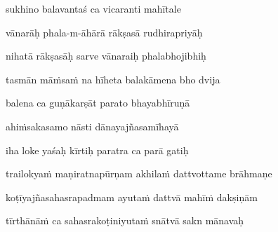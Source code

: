 sukhino balavantaś ca vicaranti mahītale \veg\dontdisplaylinenum

vānarāḥ phala-m-āhārā rākṣasā rudhirapriyāḥ\thinspace{\dandab} \dontdisplaylinenum
{}

nihatā rākṣasāḥ sarve vānaraiḥ phalabhojibhiḥ \veg\dontdisplaylinenum
{}

tasmān māṁsaṁ na hīheta balakāmena bho dvija\thinspace{\dandab} \dontdisplaylinenum
{}

balena ca guṇākarṣāt parato bhayabhīruṇā \veg\dontdisplaylinenum
{}

ahiṁsakasamo nāsti dānayajñasamīhayā\thinspace{\dandab} \dontdisplaylinenum
{}

iha loke yaśaḥ kīrtiḥ paratra ca parā gatiḥ \veg\dontdisplaylinenum
{}

\ujvers\nemsloka 
trailokyaṁ maṇiratnapūrṇam akhilaṁ dattvottame brāhmaṇe
\dontdisplaylinenum
{}

\nemslokab 
koṭīyajñasahasrapadmam ayutaṁ dattvā mahīṁ dakṣiṇām \danda\dontdisplaylinenum
{}

\nemslokac 
tīrthānāṁ ca sahasrakoṭiniyutaṁ snātvā sakn mānavaḥ
\dontdisplaylinenum
{}

